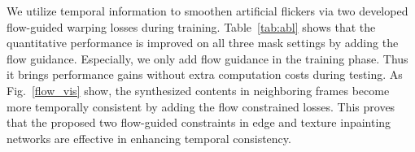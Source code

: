 We utilize temporal information to smoothen artificial flickers via two developed flow-guided warping losses during training. 
Table~\ref{tab:abl} shows that the quantitative performance is improved on all three mask settings by adding the flow guidance. Especially, we only add flow guidance in the training phase. 
Thus it brings performance gains without extra computation costs during testing.
%
As Fig.~\ref{flow_vis} show, the synthesized contents in neighboring frames become more temporally consistent by adding the flow constrained losses.
This proves that the proposed two flow-guided constraints in edge and texture inpainting networks are effective in enhancing temporal consistency.



